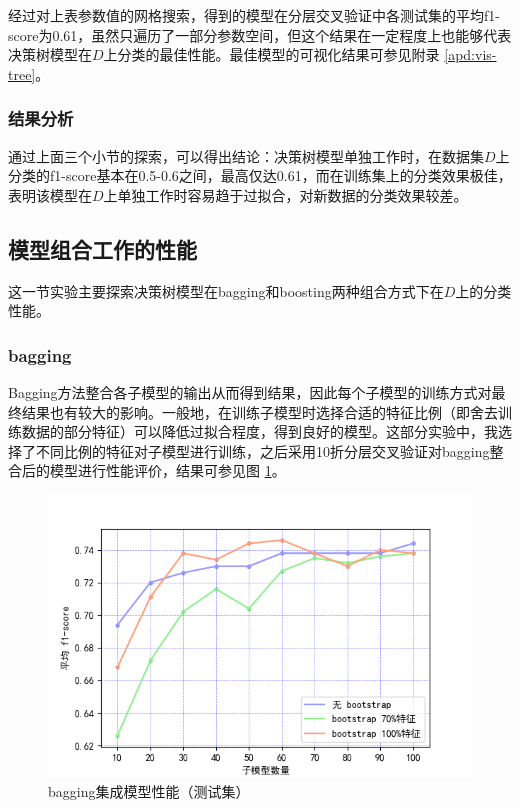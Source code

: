 \documentclass[12pt,a4paper]{article}
\theoremstyle{definition}
\begin{document}
经过对上表参数值的网格搜索，得到的模型在分层交叉验证中各测试集的平均f1-score为0.61，虽然只遍历了一部分参数空间，但这个结果在一定程度上也能够代表决策树模型在$D$上分类的最佳性能。最佳模型的可视化结果可参见附录 \ref{apd:vis-tree}。

\subsubsection{结果分析}

通过上面三个小节的探索，可以得出结论：决策树模型单独工作时，在数据集$D$上分类的f1-score基本在0.5-0.6之间，最高仅达0.61，而在训练集上的分类效果极佳，表明该模型在$D$上单独工作时容易趋于过拟合，对新数据的分类效果较差。

\subsection{模型组合工作的性能}

这一节实验主要探索决策树模型在bagging和boosting两种组合方式下在$D$上的分类性能。

\subsubsection{bagging}

Bagging方法整合各子模型的输出从而得到结果，因此每个子模型的训练方式对最终结果也有较大的影响。一般地，在训练子模型时选择合适的特征比例（即舍去训练数据的部分特征）可以降低过拟合程度，得到良好的模型。这部分实验中，我选择了不同比例的特征对子模型进行训练，之后采用10折分层交叉验证对bagging整合后的模型进行性能评价，结果可参见图 \ref{fig:bagging}。

\begin{figure}[H]
	\centering
	\includegraphics[width=0.8\linewidth]{img/bagging_kline.png}
	\caption{bagging集成模型性能（测试集）}
	\label{fig:bagging}
\end{figure}
\end{document}
